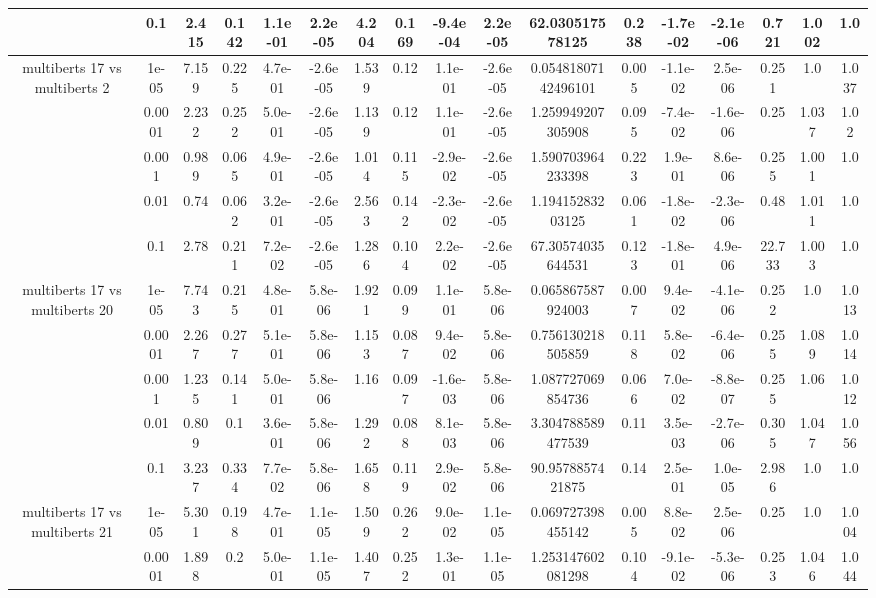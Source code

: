 \begin{tabular}{|c|c|c|c|c|c|c|c|c|c|c|c|c|c|c|c|c|}
 & 0.1 & 2.415 & 0.142 & 1.1e-01 & 2.2e-05 & 4.204 & 0.169 & -9.4e-04 & 2.2e-05 & 62.030517578125 & 0.238 & -1.7e-02 & -2.1e-06 & 0.721 & 1.002 & 1.0 \\
\hline
\multirow{5}{*}{multiberts 17 vs multiberts 2} & 1e-05 & 7.159 & 0.225 & 4.7e-01 & -2.6e-05 & 1.539 & 0.12 & 1.1e-01 & -2.6e-05 & 0.05481807142496101 & 0.005 & -1.1e-02 & 2.5e-06 & 0.251 & 1.0 & 1.037 \\
 & 0.0001 & 2.232 & 0.252 & 5.0e-01 & -2.6e-05 & 1.139 & 0.12 & 1.1e-01 & -2.6e-05 & 1.259949207305908 & 0.095 & -7.4e-02 & -1.6e-06 & 0.25 & 1.037 & 1.02 \\
 & 0.001 & 0.989 & 0.065 & 4.9e-01 & -2.6e-05 & 1.014 & 0.115 & -2.9e-02 & -2.6e-05 & 1.590703964233398 & 0.223 & 1.9e-01 & 8.6e-06 & 0.255 & 1.001 & 1.0 \\
 & 0.01 & 0.74 & 0.062 & 3.2e-01 & -2.6e-05 & 2.563 & 0.142 & -2.3e-02 & -2.6e-05 & 1.19415283203125 & 0.061 & -1.8e-02 & -2.3e-06 & 0.48 & 1.011 & 1.0 \\
 & 0.1 & 2.78 & 0.211 & 7.2e-02 & -2.6e-05 & 1.286 & 0.104 & 2.2e-02 & -2.6e-05 & 67.30574035644531 & 0.123 & -1.8e-01 & 4.9e-06 & 22.733 & 1.003 & 1.0 \\
\hline
\multirow{5}{*}{multiberts 17 vs multiberts 20} & 1e-05 & 7.743 & 0.215 & 4.8e-01 & 5.8e-06 & 1.921 & 0.099 & 1.1e-01 & 5.8e-06 & 0.065867587924003 & 0.007 & 9.4e-02 & -4.1e-06 & 0.252 & 1.0 & 1.013 \\
 & 0.0001 & 2.267 & 0.277 & 5.1e-01 & 5.8e-06 & 1.153 & 0.087 & 9.4e-02 & 5.8e-06 & 0.756130218505859 & 0.118 & 5.8e-02 & -6.4e-06 & 0.255 & 1.089 & 1.014 \\
 & 0.001 & 1.235 & 0.141 & 5.0e-01 & 5.8e-06 & 1.16 & 0.097 & -1.6e-03 & 5.8e-06 & 1.087727069854736 & 0.066 & 7.0e-02 & -8.8e-07 & 0.255 & 1.06 & 1.012 \\
 & 0.01 & 0.809 & 0.1 & 3.6e-01 & 5.8e-06 & 1.292 & 0.088 & 8.1e-03 & 5.8e-06 & 3.304788589477539 & 0.11 & 3.5e-03 & -2.7e-06 & 0.305 & 1.047 & 1.056 \\
 & 0.1 & 3.237 & 0.334 & 7.7e-02 & 5.8e-06 & 1.658 & 0.119 & 2.9e-02 & 5.8e-06 & 90.9578857421875 & 0.14 & 2.5e-01 & 1.0e-05 & 2.986 & 1.0 & 1.0 \\
\hline
\multirow{5}{*}{multiberts 17 vs multiberts 21} & 1e-05 & 5.301 & 0.198 & 4.7e-01 & 1.1e-05 & 1.509 & 0.262 & 9.0e-02 & 1.1e-05 & 0.069727398455142 & 0.005 & 8.8e-02 & 2.5e-06 & 0.25 & 1.0 & 1.004 \\
 & 0.0001 & 1.898 & 0.2 & 5.0e-01 & 1.1e-05 & 1.407 & 0.252 & 1.3e-01 & 1.1e-05 & 1.253147602081298 & 0.104 & -9.1e-02 & -5.3e-06 & 0.253 & 1.046 & 1.044 \\

\end{tabular}
